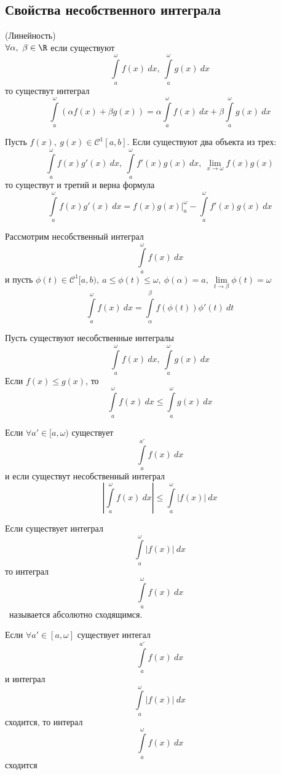 \subsection{Свойства несобственного интеграла}
\setcounter{thmcount}{0}
\begin{numtheorem}
    (Линейность)\\
    $\forall \alpha,\ \beta\in \R$ если существуют
    \[\int\limits_{a}^{\omega}f(x)\ dx,\ \int\limits_{a}^{\omega}g(x)\ dx\]
    то существут интеграл
    \[\int\limits_{a}^{\omega}(\alpha f(x)+\beta g(x))=\alpha \int\limits_{a}^{\omega}f(x)\ dx+\beta \int\limits_{a}^{\omega}g(x)\ dx\]
\end{numtheorem}
\begin{numtheorem}
    Пусть $f(x),\ g(x)\in \mathcal{C}^1[a,b]$. Если существуют два объекта из трех:
    \[\int\limits_{a}^{\omega} f(x)g'(x)\ dx,\ \int\limits_{a}^{\omega}f'(x)g(x)\ dx,\ \lim\limits_{x\to \omega}f(x)g(x)\]
    то существут и третий и верна формула
    \[\int\limits_{a}^{\omega}f(x)g'(x)\ dx=f(x)g(x)|_a^{\omega}-\int\limits_{a}^{\omega}f'(x)g(x)\ dx\]
\end{numtheorem}  
\begin{numtheorem}
    Рассмотрим несобственный интеграл 
    \[\int\limits_{a}^{\omega}f(x)\ dx\]
    и пусть $\phi(t)\in \mathcal{C}^1[a,b),\ a\leq \phi(t)\leq \omega,\ \phi(\alpha)=a,\ \lim\limits_{t\to \beta}\phi(t)=\omega$
    \[\int\limits_{a}^{\omega}f(x)\ dx=\int\limits_{\alpha}^{\beta} f(\phi(t))\phi'(t)\ dt\]
\end{numtheorem} 
\begin{numtheorem}
    Пусть существуют несобственные интегралы
    \[\int\limits_{a}^{\omega}f(x)\ dx,\ \int\limits_{a}^{\omega}g(x)\ dx\]
    Если $f(x)\leq g(x)$, то
    \[\int\limits_{a}^{\omega}f(x)\ dx\leq \int\limits_{a}^{\omega}g(x)\ dx\]
\end{numtheorem} 
\begin{numtheorem}
    Если $\forall a'\in [a, \omega)$ существует
    \[\int\limits_{a}^{a'}f(x)\ dx\]
    и если существут несобственный интеграл
    \[\left|\int\limits_{a}^{\omega}f(x)\ dx\right|\leq \int\limits_{a}^{\omega}|f(x)|\ dx\]
\end{numtheorem} 
\begin{definition}
    Если существует интеграл
    \[\int\limits_{a}^{\omega}|f(x)|\ dx\]
    то интеграл
    \[\int\limits_{a}^{\omega}f(x)\ dx\]\
    называется абсолютно сходящимся.
\end{definition} 
\begin{statement}
    Если $\forall a'\in [a, \omega]$ существует интегал
    \[\int\limits_{a}^{a'}f(x)\ dx\]
    и интеграл
    \[\int\limits_{a}^{\omega}|f(x)|\ dx\]
    сходится, то интерал
    \[\int\limits_{a}^{\omega}f(x)\ dx\]
    сходится
\end{statement} 
